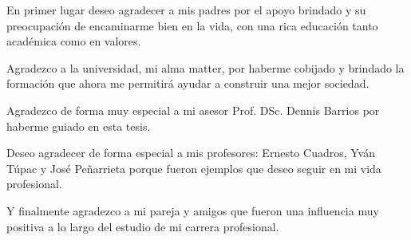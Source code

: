 \begin{agradecimientos}

En primer lugar deseo agradecer a mis padres por el apoyo brindado y su preocupación de encaminarme bien en la vida, con una rica educación tanto académica como en valores.

Agradezco a la universidad, mi alma matter, por haberme cobijado y brindado la formación que ahora me permitirá ayudar a construir una mejor sociedad.

Agradezco de forma muy especial a mi asesor Prof. DSc. Dennis Barrios por haberme guiado en esta tesis.

Deseo agradecer de forma especial a mis profesores: Ernesto Cuadros, Yván Túpac y José Peñarrieta porque fueron ejemplos que deseo seguir en mi vida profesional.

Y finalmente agradezco a mi pareja y amigos que fueron una influencia muy positiva a lo largo del estudio de mi carrera profesional.

\end{agradecimientos}
